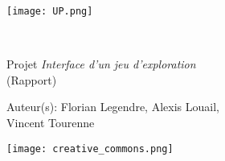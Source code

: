 \documentclass[a4paper, french]{report}
\begin{document}
\begin{titlepage}
    \begin{flushleft}
        \texttt{[image: UP.png]}\par
        \centering
        
        \vspace{13\baselineskip}       
        \HRule \\[0.4cm]

        {\Huge 
        Projet \textit{Interface d'un jeu d'exploration}\\ (Rapport)\par}
        \vspace{0.4cm}
        \HRule
        \vfill
      
        Auteur(s): Florian Legendre, Alexis Louail,\\Vincent Tourenne\medskip \par
        
        \texttt{[image: creative\_commons.png]}\par
    \end{flushleft}
\end{titlepage}


\newpage
\pagestyle{empty}
\tableofcontents
{}
\pagestyle{plain}

\newpage





\end{document}
